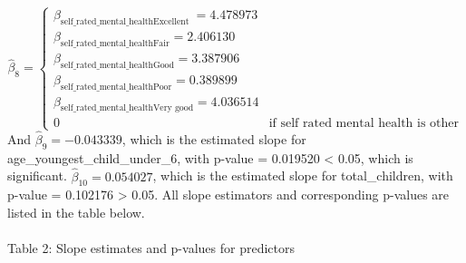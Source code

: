 \documentclass[
]{article}
\begin{document}
\begin{equation}
  \hat\beta_{8} =
    \begin{cases}
      \beta_{\text{self_rated_mental_healthExcellent }} =  4.478973\\
      \beta_{\text{self_rated_mental_healthFair}} = 2.406130  \\
      \beta_{\text{self_rated_mental_healthGood}} = 3.387906 \\
      \beta_{\text{self_rated_mental_healthPoor}} = 0.389899\\
      \beta_{\text{self_rated_mental_healthVery good}} =  4.036514 \\
      0 & \text{if self rated mental health is other}
    \end{cases}       
\end{equation} And \(\hat\beta_{9} = -0.043339\), which is the estimated
slope for age\_youngest\_child\_under\_6, with p-value = 0.019520
\textless{} 0.05, which is significant. \(\hat\beta_{10} = 0.054027\),
which is the estimated slope for total\_children, with p-value =
0.102176 \textgreater{} 0.05. All slope estimators and corresponding
p-values are listed in the table below.\\
~\\
Table 2: Slope estimates and p-values for predictors\\
\end{document}
